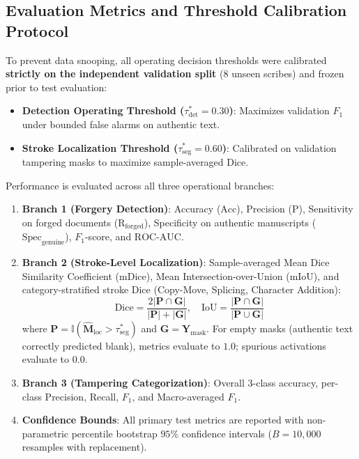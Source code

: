 \documentclass[pdflatex,sn-mathphys-num,iicol]{sn-jnl}
\begin{document}
\subsection{Evaluation Metrics and Threshold Calibration Protocol}\label{subsec5_2}
To prevent data snooping, all operating decision thresholds were calibrated \textbf{strictly on the independent validation split} (8 unseen scribes) and frozen prior to test evaluation:
\begin{itemize}
    \item \textbf{Detection Operating Threshold ($\tau_{\text{det}}^* = 0.30$)}: Maximizes validation $F_1$ under bounded false alarms on authentic text.
    \item \textbf{Stroke Localization Threshold ($\tau_{\text{seg}}^* = 0.60$)}: Calibrated on validation tampering masks to maximize sample-averaged Dice.
\end{itemize}
Performance is evaluated across all three operational branches:
\begin{enumerate}[1.]
    \item \textbf{Branch 1 (Forgery Detection)}: Accuracy ($\text{Acc}$), Precision ($\text{P}$), Sensitivity on forged documents ($\text{R}_{\text{forged}}$), Specificity on authentic manuscripts ($\text{Spec}_{\text{genuine}}$), $F_1$-score, and $\text{ROC-AUC}$.
    \item \textbf{Branch 2 (Stroke-Level Localization)}: Sample-averaged Mean Dice Similarity Coefficient ($\text{mDice}$), Mean Intersection-over-Union ($\text{mIoU}$), and category-stratified stroke Dice (Copy-Move, Splicing, Character Addition):
    \begin{equation}
    \text{Dice} = \frac{2 |\mathbf{P} \cap \mathbf{G}|}{|\mathbf{P}| + |\mathbf{G}|}, \quad \text{IoU} = \frac{|\mathbf{P} \cap \mathbf{G}|}{|\mathbf{P} \cup \mathbf{G}|}\label{eq_metrics_seg}
    \end{equation}
    where $\mathbf{P} = \mathbb{I}(\hat{\mathbf{M}}_{\text{loc}} > \tau_{\text{seg}}^*)$ and $\mathbf{G} = \mathbf{Y}_{\text{mask}}$. For empty masks (authentic text correctly predicted blank), metrics evaluate to $1.0$; spurious activations evaluate to $0.0$.
    \item \textbf{Branch 3 (Tampering Categorization)}: Overall 3-class accuracy, per-class Precision, Recall, $F_1$, and Macro-averaged $F_1$.
    \item \textbf{Confidence Bounds}: All primary test metrics are reported with non-parametric percentile bootstrap $95\%$ confidence intervals ($B = 10{,}000$ resamples with replacement).
\end{enumerate}
\end{document}
